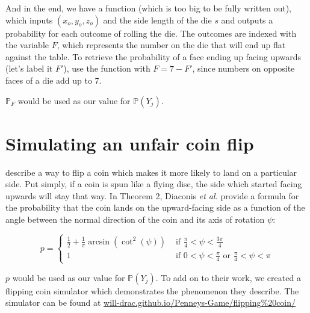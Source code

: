 \documentclass[english,12pt,a4paper,final]{article}
\begin{document}
And in the end, we have a function (which is too big to be fully written out), which inputs $(x_o, y_o, z_o)$ and the side length of the die $s$ and outputs a probability for each outcome of rolling the die. The outcomes are indexed with the variable $F$, which represents the number on the die that will end up flat against the table. To retrieve the probability of a face ending up facing upwards (let's label it $F'$), use the function with $F=7-F'$, since numbers on opposite faces of a die add up to 7.

$\mathbb{P}_F$ would be used as our value for $\mathbb{P}(Y_j)$.

\section{Simulating an unfair coin flip}

\textcite{unfairCoin} describe a way to flip a coin which makes it more likely to land on a particular side. Put simply, if a coin is spun like a flying disc, the side which started facing upwards will stay that way. In Theorem 2, Diaconis \textit{et al.} provide a formula for the probability that the coin lands on the upward-facing side as a function of the angle between the normal direction of the coin and its axis of rotation $\psi$:

\begin{equation}\label{coinProbByAngle}
	p = \begin{cases}
		\frac{1}{2} + \frac{1}{\pi}\arcsin(\cot^2(\psi)) & \text{ if } \frac{\pi}{4}<\psi<\frac{3\pi}{4}
		\\
		1 & \text{ if } 0<\psi<\frac{\pi}{4} \text{ or } \frac{\pi}{4} < \psi < \pi
	\end{cases}
\end{equation}

$p$ would be used as our value for $\mathbb{P}(Y_j)$. To add on to their work, we created a flipping coin simulator which demonstrates the phenomenon they describe. The simulator can be found at \href{https://will-drac.github.io/Penneys-Game/flipping%20coin/}{will-drac.github.io/Penneys-Game/flipping\%20coin/}
\end{document}
